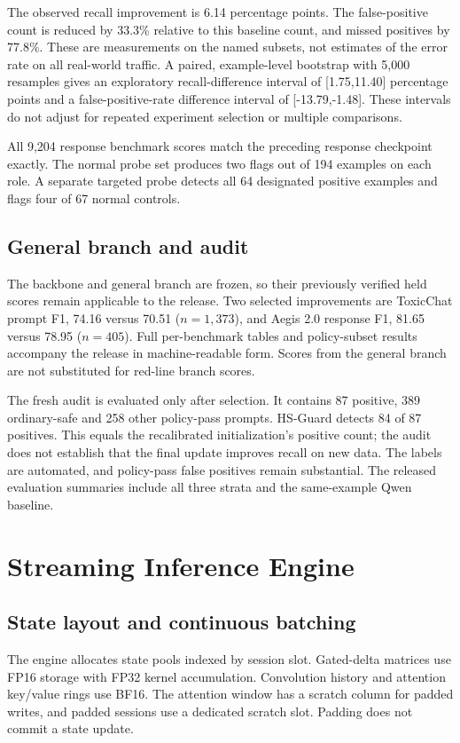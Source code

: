 \documentclass[11pt]{article}
\begin{document}
The observed recall improvement is 6.14 percentage points. The false-positive count is reduced by 33.3\% relative to this baseline count, and missed positives by 77.8\%. These are measurements on the named subsets, not estimates of the error rate on all real-world traffic. A paired, example-level bootstrap with 5,000 resamples gives an exploratory recall-difference interval of [1.75,11.40] percentage points and a false-positive-rate difference interval of [-13.79,-1.48]. These intervals do not adjust for repeated experiment selection or multiple comparisons.

All 9,204 response benchmark scores match the preceding response checkpoint exactly. The normal probe set produces two flags out of 194 examples on each role. A separate targeted probe detects all 64 designated positive examples and flags four of 67 normal controls.

\subsection{General branch and audit}
The backbone and general branch are frozen, so their previously verified held scores remain applicable to the release. Two selected improvements are ToxicChat prompt F1, 74.16 versus 70.51 ($n=1,373$), and Aegis 2.0 response F1, 81.65 versus 78.95 ($n=405$). Full per-benchmark tables and policy-subset results accompany the release in machine-readable form. Scores from the general branch are not substituted for red-line branch scores.

The fresh audit is evaluated only after selection. It contains 87 positive, 389 ordinary-safe and 258 other policy-pass prompts. HS-Guard detects 84 of 87 positives. This equals the recalibrated initialization's positive count; the audit does not establish that the final update improves recall on new data. The labels are automated, and policy-pass false positives remain substantial. The released evaluation summaries include all three strata and the same-example Qwen baseline.

\section{Streaming Inference Engine}
\subsection{State layout and continuous batching}
The engine allocates state pools indexed by session slot. Gated-delta matrices use FP16 storage with FP32 kernel accumulation. Convolution history and attention key/value rings use BF16. The attention window has a scratch column for padded writes, and padded sessions use a dedicated scratch slot. Padding does not commit a state update.
\end{document}

